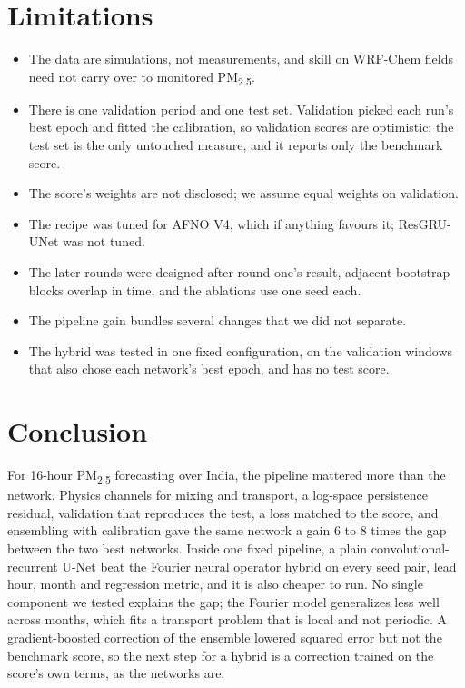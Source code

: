 \documentclass[conference]{IEEEtran}
\newcommand{\PM}{PM\textsubscript{2.5}}
\begin{document}
\section{Limitations}
\begin{itemize}
\item The data are simulations, not measurements, and skill on WRF-Chem fields need not carry over to monitored \PM.
\item There is one validation period and one test set. Validation picked each run's best epoch and fitted the calibration, so validation scores are optimistic; the test set is the only untouched measure, and it reports only the benchmark score.
\item The score's weights are not disclosed; we assume equal weights on validation.
\item The recipe was tuned for AFNO V4, which if anything favours it; ResGRU-UNet was not tuned.
\item The later rounds were designed after round one's result, adjacent bootstrap blocks overlap in time, and the ablations use one seed each.
\item The pipeline gain bundles several changes that we did not separate.
\item The hybrid was tested in one fixed configuration, on the validation windows that also chose each network's best epoch, and has no test score.
\end{itemize}

\section{Conclusion}
For 16-hour \PM{} forecasting over India, the pipeline mattered more than the network. Physics channels for mixing and transport, a log-space persistence residual, validation that reproduces the test, a loss matched to the score, and ensembling with calibration gave the same network a gain 6 to 8 times the gap between the two best networks. Inside one fixed pipeline, a plain convolutional-recurrent U-Net beat the Fourier neural operator hybrid on every seed pair, lead hour, month and regression metric, and it is also cheaper to run. No single component we tested explains the gap; the Fourier model generalizes less well across months, which fits a transport problem that is local and not periodic. A gradient-boosted correction of the ensemble lowered squared error but not the benchmark score, so the next step for a hybrid is a correction trained on the score's own terms, as the networks are.
\end{document}
